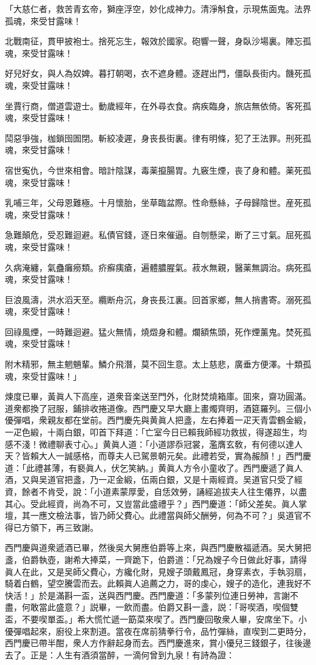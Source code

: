 \begin{myquote}
「大慈仁者，救苦青玄帝，獅座浮空，妙化成神力。清淨斛食，示現焦面鬼。法界孤魂，來受甘露味！　

北戰南征，貫甲披袍士。捨死忘生，報效於國家。砲響一聲，身臥沙場裏。陣忘孤魂，來受甘露味！

好兒好女，與人為奴婢。暮打朝喝，衣不遮身體。逐趕出門，僵臥長街内。饑死孤魂，來受甘露味！

坐賈行商，僧道雲遊士。動歲經年，在外尋衣食。病疾臨身，旅店無依倚。客死孤魂，來受甘露味！

鬦惡爭強，枷鎖囹圄閉。斬絞凌遲，身丧長街裏。律有明條，犯了王法罪。刑死孤魂，來受甘露味！

宿世寃仇，今世來相會。暗計陰謀，毒薬攛腸胃。九竅生煙，丧了身和體。薬死孤魂，來受甘露味！

乳哺三年，父母恩難極。十月懷胎，坐草臨盆際。性命懸絲，子母歸陰世。産死孤魂，來受甘露味！

急難顛危，受忍難迴避。私債官錢，逐日來催逼。自刎懸梁，断了三寸氣。屈死孤魂，來受甘露味！

久病淹纏，氣蠱癱癆類。疥癬痍瘡，遍體膿腥氣。菽水無親，醫薬無調治。病死孤魂，來受甘露味！

巨浪風濤，洪水滔天至。纜断舟沉，身丧長江裏。回首家鄉，無人捎書寄。溺死孤魂，來受甘露味！

回祿風煙，一時難迴避。猛火無情，燒燬身和體。爛額焦頭，死作煙薰鬼。焚死孤魂，來受甘露味！

附木精邪，無主魍魎輩。鱗介飛潛，莫不回生意。太上慈悲，廣垂方便澤。十類孤魂，來受甘露味！」
\end{myquote}

煉度已畢，黃眞人下高座，道衆音楽送至門外，化財焚燒箱庫。囬來，齋功圓滿。道衆都換了冠服，鋪排收捲道像。西門慶又早大廳上畫燭齊明，酒筵羅列。三個小優彈唱，衆親友都在堂前。西門慶先與黄眞人把盞，左右捧着一疋天青雲鶴金緞，一疋色緞，十兩白銀，叩首下拜道：「亡室今日已賴我師經功救拔，得遂超生，均感不淺！微禮聊表寸心。」黄眞人道：「小道謬忝冠裳，濫膺玄敎，有何德以達人天？皆賴大人一誠感格，而尊夫人已駕景朝元矣。此禮若受，實為赧顏！」西門慶道：「此禮甚薄，有褻眞人，伏乞笑納。」黄眞人方令小童收了。西門慶遞了眞人酒，又與吴道官把盞，乃一疋金緞，伍兩白銀，又是十兩經資。吴道官只受了經資，餘者不肯受，說：「小道素蒙厚愛，自恁效勞，誦經追拔夫人往生僊界，以盡其心。受此經資，尚為不可，又豈當此盛禮乎？」西門慶道：「師父差矣。眞人掌壇，其一應文檢法事，皆乃師父費心。此禮當與師父酬勞，何為不可？」吳道官不得已方領下，再三致謝。

西門慶與道衆遞酒已畢，然後吳大舅應伯爵等上來，與西門慶散福遞酒。吴大舅把盞，伯爵執壺，謝希大捧菜，一齊跪下，伯爵道：「兄為嫂子今日做此好事，請得眞人在此，又是吴師父費心，方纔化財，見嫂子頭戴鳳冠，身穿素衣，手執羽扇，騎着白鶴，望空騰雲而去。此賴眞人追薦之力，哥的虔心，嫂子的造化，連我好不快活！」於是滿斟一盃，送與西門慶。西門慶道：「多蒙列位連日勞神，言謝不盡，何敢當此盛意？」説畢，一飲而盡。伯爵又斟一盞，説：「哥喫酒，喫個雙盃，不要喫單盃。」希大慌忙遞一筯菜來喫了。西門慶回敬衆人畢，安席坐下。小優彈唱起來，廚役上來割道。當夜在席前猜拳行令，品竹彈絲，直喫到二更時分，西門慶已帶半酣，衆人方作辭起身而去。西門慶進來，賞小優兒三錢銀子，往後邊去了。正是：人生有酒須當醉，一滴何曾到九泉！有詩為證：

